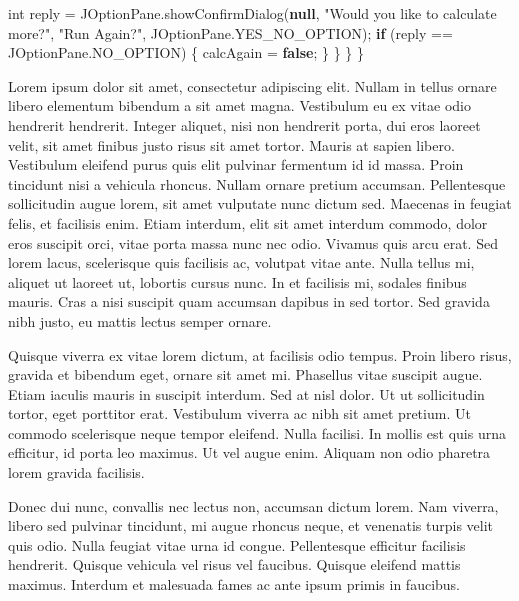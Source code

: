 \documentclass[\pandocDocMode,longtable, floatsintext, noextraspace]{apa6}
\newenvironment{Shaded}{}{}
\newcommand{\BuiltInTok}[1]{#1}
\newcommand{\ControlFlowTok}[1]{\textcolor[rgb]{0.00,0.44,0.13}{\textbf{#1}}}
\newcommand{\DataTypeTok}[1]{\textcolor[rgb]{0.56,0.13,0.00}{#1}}
\newcommand{\FunctionTok}[1]{\textcolor[rgb]{0.02,0.16,0.49}{#1}}
\newcommand{\KeywordTok}[1]{\textcolor[rgb]{0.00,0.44,0.13}{\textbf{#1}}}
\newcommand{\NormalTok}[1]{#1}
\newcommand{\OperatorTok}[1]{\textcolor[rgb]{0.40,0.40,0.40}{#1}}
\newcommand{\StringTok}[1]{\textcolor[rgb]{0.25,0.44,0.63}{#1}}
\begin{document}
\begin{Shaded}
\begin{Highlighting}[numbers=left,,firstnumber=100,]
            \DataTypeTok{int}\NormalTok{ reply }\OperatorTok{=} \BuiltInTok{JOptionPane}\OperatorTok{.}\FunctionTok{showConfirmDialog}\OperatorTok{(}\KeywordTok{null}\OperatorTok{,} \StringTok{"Would you like to calculate more?"}\OperatorTok{,} 
                \StringTok{"Run Again?"}\OperatorTok{,}  \BuiltInTok{JOptionPane}\OperatorTok{.}\FunctionTok{YES\_NO\_OPTION}\OperatorTok{);}
            \ControlFlowTok{if} \OperatorTok{(}\NormalTok{reply }\OperatorTok{==} \BuiltInTok{JOptionPane}\OperatorTok{.}\FunctionTok{NO\_OPTION}\OperatorTok{)} \OperatorTok{\{}
\NormalTok{                    calcAgain }\OperatorTok{=} \KeywordTok{false}\OperatorTok{;}
            \OperatorTok{\}}
        \OperatorTok{\}}
    \OperatorTok{\}} 
\OperatorTok{\}}
\end{Highlighting}
\end{Shaded}

Lorem ipsum dolor sit amet, consectetur adipiscing elit. Nullam in
tellus ornare libero elementum bibendum a sit amet magna. Vestibulum eu
ex vitae odio hendrerit hendrerit. Integer aliquet, nisi non hendrerit
porta, dui eros laoreet velit, sit amet finibus justo risus sit amet
tortor. Mauris at sapien libero. Vestibulum eleifend purus quis elit
pulvinar fermentum id id massa. Proin tincidunt nisi a vehicula rhoncus.
Nullam ornare pretium accumsan. Pellentesque sollicitudin augue lorem,
sit amet vulputate nunc dictum sed. Maecenas in feugiat felis, et
facilisis enim. Etiam interdum, elit sit amet interdum commodo, dolor
eros suscipit orci, vitae porta massa nunc nec odio. Vivamus quis arcu
erat. Sed lorem lacus, scelerisque quis facilisis ac, volutpat vitae
ante. Nulla tellus mi, aliquet ut laoreet ut, lobortis cursus nunc. In
et facilisis mi, sodales finibus mauris. Cras a nisi suscipit quam
accumsan dapibus in sed tortor. Sed gravida nibh justo, eu mattis lectus
semper ornare.

Quisque viverra ex vitae lorem dictum, at facilisis odio tempus. Proin
libero risus, gravida et bibendum eget, ornare sit amet mi. Phasellus
vitae suscipit augue. Etiam iaculis mauris in suscipit interdum. Sed at
nisl dolor. Ut ut sollicitudin tortor, eget porttitor erat. Vestibulum
viverra ac nibh sit amet pretium. Ut commodo scelerisque neque tempor
eleifend. Nulla facilisi. In mollis est quis urna efficitur, id porta
leo maximus. Ut vel augue enim. Aliquam non odio pharetra lorem gravida
facilisis.

Donec dui nunc, convallis nec lectus non, accumsan dictum lorem. Nam
viverra, libero sed pulvinar tincidunt, mi augue rhoncus neque, et
venenatis turpis velit quis odio. Nulla feugiat vitae urna id congue.
Pellentesque efficitur facilisis hendrerit. Quisque vehicula vel risus
vel faucibus. Quisque eleifend mattis maximus. Interdum et malesuada
fames ac ante ipsum primis in faucibus.
\end{document}
